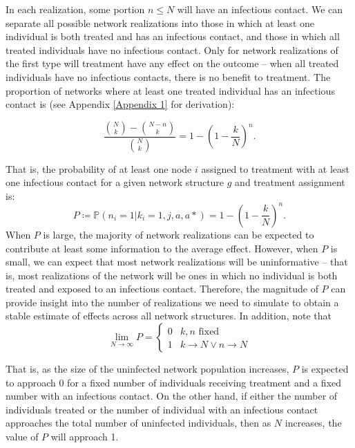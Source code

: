 \documentclass{article}
\theoremstyle{definition}
\begin{document}
In each realization, some portion $n \le N$ will have an infectious contact. We can separate all possible network realizations into those in which at least one individual is both treated and has an infectious contact, and those in which all treated individuals have no infectious contact. Only for network realizations of the first type will treatment have any effect on the outcome -- when all treated individuals have no infectious contacts, there is no benefit to treatment. The proportion of networks where at least one treated individual has an infectious contact is (see Appendix \ref{Appendix 1} for derivation):

\begin{equation}\label{eq:16}
    \frac{{\binom{N}{k}}-{\binom{N-n}{k}}}{{\binom{N}{k}}}=1-\left(1-\frac{k}{N}\right)^{n}.
\end{equation}

That is, the probability of at least one node $i$ assigned to treatment with at least one infectious contact for a given network structure $g$ and treatment assignment is:
\begin{equation}\label{eq:17}
    P \coloneqq \mathbb{P}\left(n_{i}=1 \vert k_{i}=1,j,a,a*\right)=1-\left(1-\frac{k}{N}\right)^{n}.
\end{equation}
When $P$ is large, the majority of network realizations can be expected to contribute at least some information to the average effect. However, when $P$ is small, we can expect that most network realizations will be uninformative -- that is, most realizations of the network will be ones in which no individual is both treated and exposed to an infectious contact. Therefore, the magnitude of $P$ can provide insight into the number of realizations we need to simulate to obtain a stable estimate of effects across all network structures. In addition, note that
\begin{equation}\label{eq:18}
    \lim_{N \to \infty}P=\begin{cases}0 & k,n \text{ fixed} \\ 1 & k \to N \lor n \to N  \end{cases}
\end{equation}

That is, as the size of the uninfected network population increases, $P$ is expected to approach 0 for a fixed number of individuals receiving treatment and a fixed number with an infectious contact. On the other hand, if either the number of individuals treated or the number of individual with an infectious contact approaches the total number of uninfected individuals, then as $N$ increases, the value of $P$ will approach 1.
\end{document}
